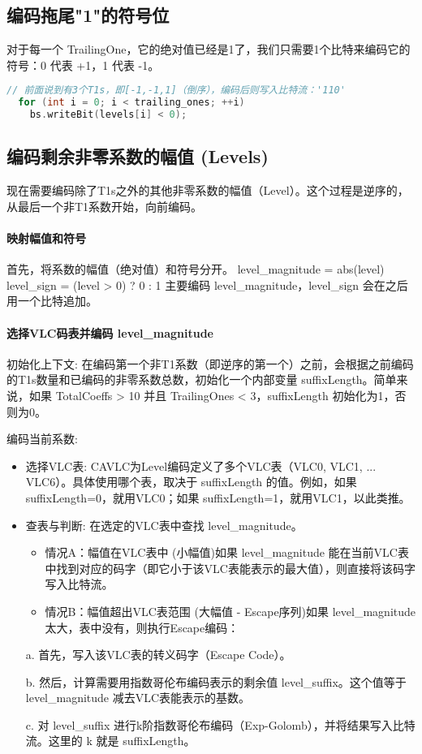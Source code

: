 \documentclass{/Users/hi/Study/template/code}
\begin{document}
\subsection{编码拖尾"1"的符号位}
对于每一个 TrailingOne，它的绝对值已经是1了，我们只需要1个比特来编码它的符号：0 代表 +1，1 代表 -1。

\begin{lstlisting}[language=c]
// 前面说到有3个T1s，即[-1,-1,1]（倒序），编码后则写入比特流：'110'
  for (int i = 0; i < trailing_ones; ++i)
    bs.writeBit(levels[i] < 0);
\end{lstlisting}


\subsection{编码剩余非零系数的幅值 (Levels)}
现在需要编码除了T1s之外的其他非零系数的幅值（Level）。这个过程是逆序的，从最后一个非T1系数开始，向前编码。

\paragraph{映射幅值和符号}
首先，将系数的幅值（绝对值）和符号分开。
level\_magnitude = abs(level)
level\_sign = (level > 0) ? 0 : 1
主要编码 level\_magnitude，level\_sign 会在之后用一个比特追加。

\paragraph{选择VLC码表并编码 level\_magnitude}
初始化上下文: 在编码第一个非T1系数（即逆序的第一个）之前，会根据之前编码的T1s数量和已编码的非零系数总数，初始化一个内部变量 suffixLength。简单来说，如果 TotalCoeffs > 10 并且 TrailingOnes < 3，suffixLength 初始化为1，否则为0。

编码当前系数:
\begin{itemize}
	\item 选择VLC表: CAVLC为Level编码定义了多个VLC表（VLC0, VLC1, ... VLC6）。具体使用哪个表，取决于 suffixLength 的值。例如，如果 suffixLength=0，就用VLC0；如果 suffixLength=1，就用VLC1，以此类推。
	\item 查表与判断: 在选定的VLC表中查找 level\_magnitude。
	      \begin{itemize}
		      \item 情况A：幅值在VLC表中 (小幅值)如果 level\_magnitude 能在当前VLC表中找到对应的码字（即它小于该VLC表能表示的最大值），则直接将该码字写入比特流。

		      \item 情况B：幅值超出VLC表范围 (大幅值 - Escape序列)如果 level\_magnitude 太大，表中没有，则执行Escape编码：
	      \end{itemize}
	      a. 首先，写入该VLC表的转义码字（Escape Code）。

	      b. 然后，计算需要用指数哥伦布编码表示的剩余值 level\_suffix。这个值等于 level\_magnitude 减去VLC表能表示的基数。

	      c. 对 level\_suffix 进行k阶指数哥伦布编码（Exp-Golomb），并将结果写入比特流。这里的 k 就是 suffixLength。
\end{itemize}
\end{document}
